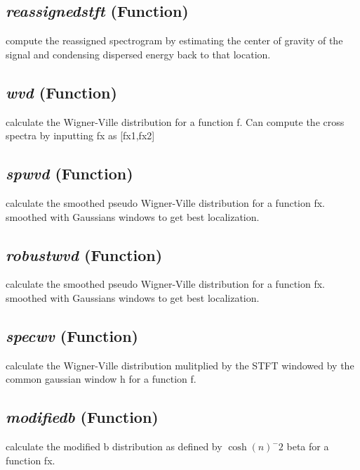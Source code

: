 \subsection{\textit{reassignedstft} (Function)}
\label{ssec:processing.tftools.reassignedstft}

compute the reassigned spectrogram by estimating the center of gravity of 
    the signal and condensing dispersed energy back to that location.
   

\subsection{\textit{wvd} (Function)}
\label{ssec:processing.tftools.wvd}

calculate the 
    Wigner-Ville distribution for a function f. Can compute the cross spectra
    by inputting fx as [fx1,fx2] 

\subsection{\textit{spwvd} (Function)}
\label{ssec:processing.tftools.spwvd}

calculate the smoothed pseudo Wigner-Ville distribution for a function
    fx. smoothed with Gaussians windows to get best localization. 

\subsection{\textit{robustwvd} (Function)}
\label{ssec:processing.tftools.robustwvd}

calculate the smoothed pseudo Wigner-Ville distribution for a function
    fx. smoothed with Gaussians windows to get best localization. 


\subsection{\textit{specwv} (Function)}
\label{ssec:processing.tftools.specwv}

calculate 
    the Wigner-Ville distribution mulitplied by the STFT windowed by the common 
    gaussian window h for a function f. 

\subsection{\textit{modifiedb} (Function)}
\label{ssec:processing.tftools.modifiedb}

calculate the modified b distribution as defined by $\cosh(n)^-2$ beta 
    for a function fx. 

